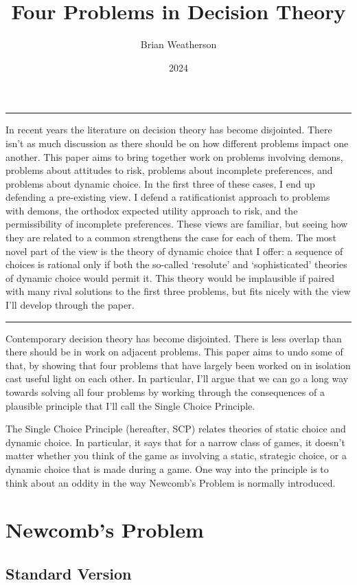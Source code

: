 \documentclass[
  10pt,
  letterpaper,
  DIV=11,
  numbers=noendperiod,
  twoside]{scrartcl}
\title{Four Problems in Decision Theory}
\author{Brian Weatherson}
\date{2024}
\renewenvironment{abstract}
 {\vspace{-1.25cm}
 \quotation\small\noindent\rule{\linewidth}{.5pt}\par\smallskip
 \noindent }
 {\par\noindent\rule{\linewidth}{.5pt}\endquotation}
\begin{document}
\maketitle
\begin{abstract}
In recent years the literature on decision theory has become disjointed.
There isn't as much discussion as there should be on how different
problems impact one another. This paper aims to bring together work on
problems involving demons, problems about attitudes to risk, problems
about incomplete preferences, and problems about dynamic choice. In the
first three of these cases, I end up defending a pre-existing view. I
defend a ratificationist approach to problems with demons, the orthodox
expected utility approach to risk, and the permissibility of incomplete
preferences. These views are familiar, but seeing how they are related
to a common strengthens the case for each of them. The most novel part
of the view is the theory of dynamic choice that I offer: a sequence of
choices is rational only if both the so-called `resolute' and
`sophisticated' theories of dynamic choice would permit it. This theory
would be implausible if paired with many rival solutions to the first
three problems, but fits nicely with the view I'll develop through the
paper.
\end{abstract}

Contemporary decision theory has become disjointed. There is less
overlap than there should be in work on adjacent problems. This paper
aims to undo some of that, by showing that four problems that have
largely been worked on in isolation cast useful light on each other. In
particular, I'll argue that we can go a long way towards solving all
four problems by working through the consequences of a plausible
principle that I'll call the Single Choice Principle.

The Single Choice Principle (hereafter, SCP) relates theories of static
choice and dynamic choice. In particular, it says that for a narrow
class of games, it doesn't matter whether you think of the game as
involving a static, strategic choice, or a dynamic choice that is made
during a game. One way into the principle is to think about an oddity in
the way Newcomb's Problem is normally introduced.

\section{Newcomb's Problem}\label{sec-newcomb}

\subsection{Standard Version}\label{sec-newcomb-standard}
\end{document}
